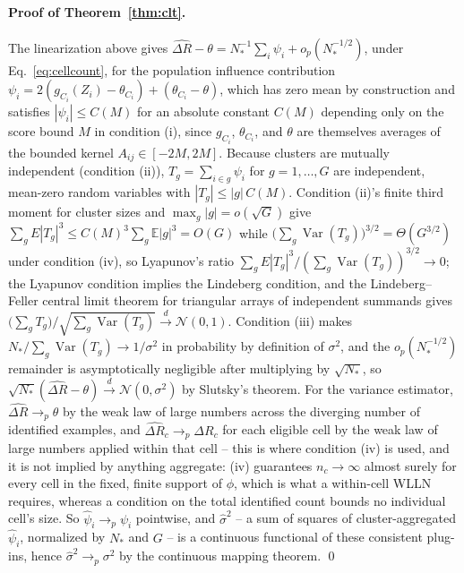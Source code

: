 \documentclass[preprint,times,10pt,a4paper]{elsarticle}
\theoremstyle{plain}
\theoremstyle{definition}
\begin{document}
\paragraph{Proof of Theorem~\ref{thm:clt}.} The linearization above gives
$\widehat{\Delta R}-\theta=N_*^{-1}\sum_i\psi_i+o_p(N_*^{-1/2})$, under
Eq.~\eqref{eq:cellcount}, for the population
influence contribution $\psi_i=2(g_{C_i}(Z_i)-\theta_{C_i})+(\theta_{C_i}-\theta)$, which
has zero mean by construction and satisfies $|\psi_i|\le C(M)$ for an absolute constant
$C(M)$ depending only on the score bound $M$ in condition (i), since $g_{C_i}$,
$\theta_{C_i}$, and $\theta$ are themselves averages of the bounded kernel
$A_{ij}\in[-2M,2M]$. Because clusters are mutually independent (condition (ii)),
$T_g=\sum_{i\in g}\psi_i$ for $g=1,\dots,G$ are independent, mean-zero random variables
with $|T_g|\le|g|\,C(M)$. Condition (ii)'s finite third moment for cluster sizes and
$\max_g|g|=o(\sqrt G)$ give
$\sum_gE|T_g|^3\le C(M)^3\sum_g\mathbb E|g|^3=O(G)$ while
$\bigl(\sum_g\operatorname{Var}(T_g)\bigr)^{3/2}=\Theta(G^{3/2})$ under condition (iv), so
Lyapunov's ratio $\sum_gE|T_g|^3/(\sum_g\operatorname{Var}(T_g))^{3/2}\to0$; the
Lyapunov condition implies the Lindeberg condition, and the Lindeberg--Feller central
limit theorem for triangular arrays of independent summands
\citep{serfling1980approximation,vandervaart1998asymptotic} gives
$\bigl(\sum_gT_g\bigr)/\sqrt{\sum_g\operatorname{Var}(T_g)}\xrightarrow{d}\mathcal N(0,1)$.
Condition (iii) makes $N_*/\sum_g\operatorname{Var}(T_g)\to1/\sigma^2$ in probability by
definition of $\sigma^2$, and the $o_p(N_*^{-1/2})$ remainder is asymptotically
negligible after multiplying by $\sqrt{N_*}$, so
$\sqrt{N_*}(\widehat{\Delta R}-\theta)\xrightarrow{d}\mathcal N(0,\sigma^2)$ by Slutsky's
theorem. For the variance estimator, $\widehat{\Delta R}\to_p\theta$ by the weak law of
large numbers across the diverging number of identified examples, and
$\widehat{\Delta R}_c\to_p\Delta R_c$ for each eligible cell by the weak law of large
numbers applied within that cell -- this is where condition (iv) is used, and it is not
implied by anything aggregate: (iv) guarantees $n_c\to\infty$ almost surely for every cell
in the fixed, finite support of $\phi$, which is what a within-cell WLLN requires, whereas
a condition on the total identified count bounds no individual cell's size. So $\widehat\psi_i\to_p\psi_i$ pointwise, and
$\widehat\sigma^2$ -- a sum of squares of cluster-aggregated $\widehat\psi_i$, normalized
by $N_*$ and $G$ -- is a continuous functional of these consistent plug-ins, hence
$\widehat\sigma^2\to_p\sigma^2$ by the continuous mapping theorem. \qed
\end{document}
